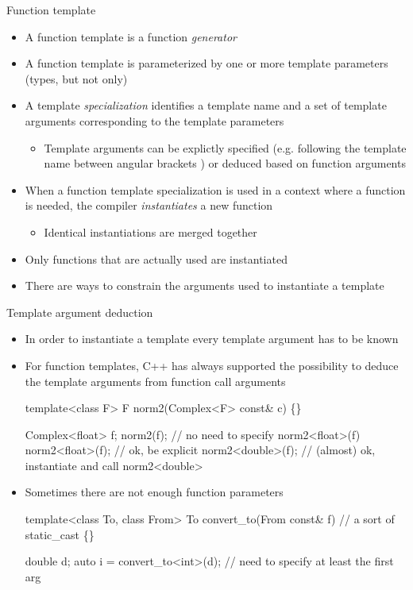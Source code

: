 \begin{frame}{Function template \insertcontinuationtext}
  \begin{itemize}
  \item A function template is a function \textit{generator}
  \item A function template is parameterized by one or more template parameters
    (types, but not only)
  \item A template \textit{specialization} identifies a template name and a set
    of template arguments corresponding to the template parameters
    \begin{itemize}
    \item Template arguments can be explictly specified (e.g. following the
      template name between angular brackets \code{<>}) or deduced based on
      function arguments
    \end{itemize}
  \item When a function template specialization is used in a context where a
    function is needed, the compiler \textit{instantiates} a new function
    \begin{itemize}
    \item Identical instantiations are merged together
    \end{itemize}
  \item Only functions that are actually used are instantiated
  \item There are ways to constrain the arguments used to instantiate a template
  \end{itemize}
\end{frame}

\begin{frame}[fragile]{Template argument deduction}

  \begin{itemize}
  \item In order to instantiate a template every template argument has to be
    known
  \item For function templates, C++ has always supported the possibility to
    deduce the template arguments from function call arguments
    \begin{codeblock}
template<class F> F norm2(Complex<F> const& c) \{\ddd\}

Complex<float> f;
norm2(f);          // no need to specify norm2<float>(f)
norm2<float>(f);   // ok, be explicit
norm2<double>(f);  // (almost) ok, instantiate and call norm2<double>\end{codeblock}

  \item Sometimes there are not enough function parameters
    \begin{codeblock}
template<class To, class From>
To convert_to(From const& f) // a sort of static_cast
\{\ddd\}

double d;
auto i = convert_to<int>(d); // need to specify at least the first arg\end{codeblock}
  \end{itemize}
\end{frame}

